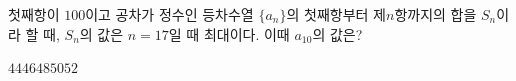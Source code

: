 첫째항이 $100$이고 공차가 정수인 등차수열 $\{a_n\}$의 첫째항부터 제$n$항까지의 합을 $S_n$이라 할 때, $S_n$의 값은 $n=17$일 때 최대이다. 이때 $a_{10}$의 값은?
\begin{choices32}{$44$}{$46$}{$48$}{$50$}{$52$}\end{choices32}
